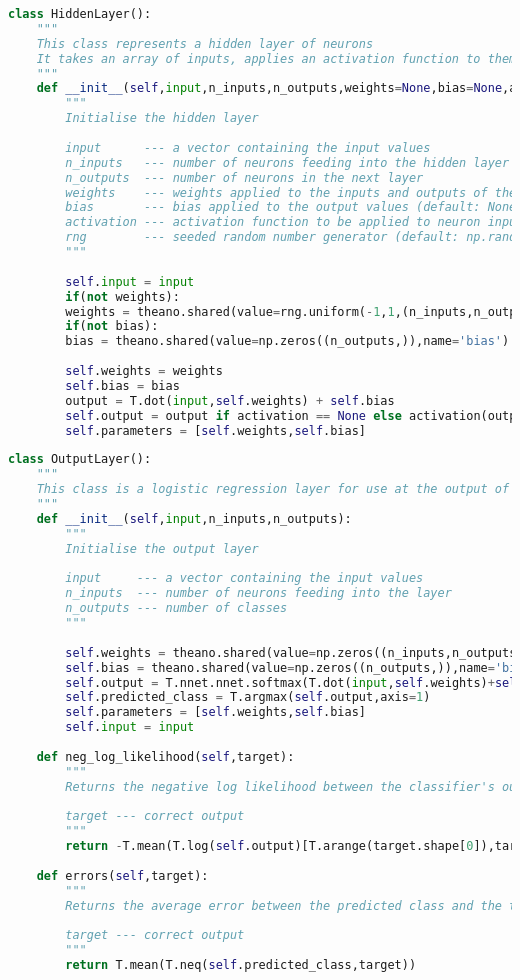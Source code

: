 \newpage
\begin{lstlisting}[language=Python, caption=Hidden Layer, captionpos=b, label={list:mlp_hidden}]
class HiddenLayer():
	"""
	This class represents a hidden layer of neurons
	It takes an array of inputs, applies an activation function to them, and returns the output
	"""
	def __init__(self,input,n_inputs,n_outputs,weights=None,bias=None,activation=T.tanh,rng=np.random.RandomState(2)):
		"""
		Initialise the hidden layer
		
		input      --- a vector containing the input values
		n_inputs   --- number of neurons feeding into the hidden layer
		n_outputs  --- number of neurons in the next layer
		weights    --- weights applied to the inputs and outputs of the hidden layer (default: None)
		bias       --- bias applied to the output values (default: None)
		activation --- activation function to be applied to neuron inputs (default: tanh)
		rng        --- seeded random number generator (default: np.random.RandomState(2))
		"""
		
		self.input = input
		if(not weights):
		weights = theano.shared(value=rng.uniform(-1,1,(n_inputs,n_outputs)),name = 'weights')
		if(not bias):
		bias = theano.shared(value=np.zeros((n_outputs,)),name='bias')
		
		self.weights = weights
		self.bias = bias
		output = T.dot(input,self.weights) + self.bias
		self.output = output if activation == None else activation(output) 
		self.parameters = [self.weights,self.bias]
\end{lstlisting}
\newpage
\begin{lstlisting}[language=Python, caption=Output Layer, captionpos=b, label={list:mlp_output}]
class OutputLayer():
	"""
	This class is a logistic regression layer for use at the output of a neural network
	"""
	def __init__(self,input,n_inputs,n_outputs):
		"""
		Initialise the output layer
		
		input     --- a vector containing the input values
		n_inputs  --- number of neurons feeding into the layer
		n_outputs --- number of classes
		"""
		
		self.weights = theano.shared(value=np.zeros((n_inputs,n_outputs)),name='weights')
		self.bias = theano.shared(value=np.zeros((n_outputs,)),name='bias')
		self.output = T.nnet.nnet.softmax(T.dot(input,self.weights)+self.bias)
		self.predicted_class = T.argmax(self.output,axis=1)
		self.parameters = [self.weights,self.bias]
		self.input = input
	
	def neg_log_likelihood(self,target):
		"""
		Returns the negative log likelihood between the classifier's output and a target
		
		target --- correct output
		"""
		return -T.mean(T.log(self.output)[T.arange(target.shape[0]),target])     
	
	def errors(self,target):
		"""
		Returns the average error between the predicted class and the target class
		
		target --- correct output
		"""
		return T.mean(T.neq(self.predicted_class,target))     
\end{lstlisting}